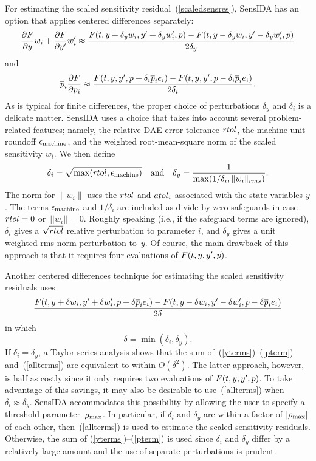 For estimating the scaled sensitivity residual~(\ref{scaledsensres}), 
SensIDA has an option that applies centered
differences separately:
\begin{equation}
\frac{\partial F}{\partial y} w_i + \frac{\partial F}{\partial y^{\prime}} w^{\prime}_i \approx
\frac{F(t,y+\delta_y w_i,y^{\prime}+\delta_y w^{\prime}_i,p)-
F(t,y-\delta_y w_i,y^{\prime}-\delta_y w^{\prime}_i,p)}{2 \delta_y}
\label{yterms}
\end{equation}
and
\begin{equation}
\overline{p}_i \frac{\partial F}{\partial p_i} \approx
\frac{F(t,y,y^{\prime},p+\delta_i \overline{p}_i e_i)-
F(t,y,y^{\prime},p-\delta_i \overline{p}_i e_i)}{2 \delta_i}.
\label{pterm}
\end{equation}
As is typical for finite differences, the proper choice of
perturbations $\delta_y$ and $\delta_i$ is a delicate matter.
SensIDA uses a choice that takes into account
several problem-related features;
namely, the relative DAE error tolerance
${\sc rtol}$, the machine unit roundoff $\epsilon_{\rm machine}$,
and the weighted root-mean-square norm of the scaled sensitivity
$w_i$. 
We then define
\begin{equation}
\delta_i = \sqrt{\max({\sc rtol}, \epsilon_{\rm machine})}
~~~{\rm and}~~~
\delta_y = \frac{1}{\max(1/\delta_i, \|w_i\|_{rms})}.
\end{equation}
The norm for $\|w_i\|$ uses the ${\sc rtol}$ and ${\sc atol}_i$ associated with
the state variables $y$.
The terms $\epsilon_{\rm machine}$ and $1/\delta_i$ are included as
divide-by-zero safeguards in case~${\sc rtol} = 0$ or~$||w_i|| = 0$.
Roughly speaking (i.e., if the safeguard terms are ignored),
$\delta_i$ gives a $\sqrt{{\sc rtol}}$ relative perturbation to parameter
$i$, and $\delta_y$ gives a unit weighted rms norm perturbation to~$y$.
Of course, the main drawback of this approach is that it requires four
evaluations of $F(t,y,y^{\prime},p)$.

Another centered differences technique for estimating the scaled
sensitivity residuals uses
\begin{equation}
\frac{F(t,y+\delta w_i,y^{\prime}+\delta w^{\prime}_i,p+\delta \overline{p}_i e_i)-
F(t,y-\delta
w_i,y^{\prime}-\delta w^{\prime}_i,p-\delta \overline{p}_i e_i)}{2 \delta}
\label{allterms}
\end{equation}
in which
$$
\delta = \min(\delta_i, \delta_y).
$$
If $\delta_i = \delta_y$, a Taylor series analysis shows
that the sum of~(\ref{yterms})--(\ref{pterm})
and~(\ref{allterms}) are equivalent to within $O(\delta^2)$.
The latter approach, however, is half as costly since it only requires
two evaluations of $F(t,y,y^{\prime},p)$.  
To take advantage of this savings, it may also be desirable to
use~(\ref{allterms}) when $\delta_i \approx \delta_y$.
SensIDA accommodates this possibility by allowing the user to
specify a threshold parameter~$\rho_{\max}$.
In particular, if $\delta_i$ and $\delta_y$ are within a factor of
$|\rho_{\max}|$ of each other, then~(\ref{allterms}) is used to estimate the
scaled sensitivity residuals.
Otherwise, the sum of (\ref{yterms})--(\ref{pterm}) is used since
$\delta_i$ and $\delta_y$ differ by a relatively large amount and the
use of separate perturbations is prudent.

